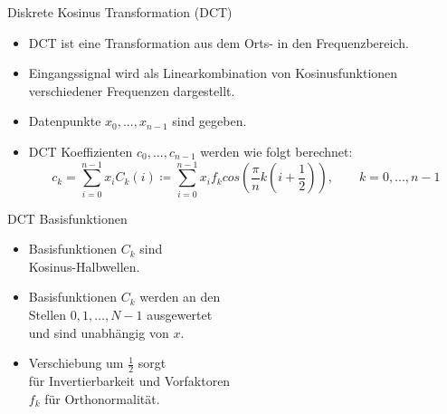 \documentclass[aspectratio=169, 12pt]{beamer}
\begin{document}
\begin{frame}{Diskrete Kosinus Transformation (DCT)}
  \begin{itemize}
    \item DCT ist eine Transformation aus dem Orts- in den Frequenzbereich.
    \item Eingangssignal wird als Linearkombination von Kosinusfunktionen verschiedener Frequenzen dargestellt.
    \item Datenpunkte $x_0, ..., x_{n-1}$ sind gegeben.
    \item DCT Koeffizienten $c_0, ..., c_{n-1}$ werden wie folgt berechnet:
          \begin{equation*}
            c_k = \sum_{i=0}^{n-1} x_i C_k(i) \coloneqq \sum_{i=0}^{n-1} x_i f_k cos\left( \frac{\pi}{n} k \left( i + \frac{1}{2} \right) \right), \qquad k = 0, ..., n-1
          \end{equation*}
  \end{itemize}
\end{frame}

\begin{frame}{DCT Basisfunktionen}
  \begin{figure}
    \vspace{-1.3cm}
  \end{figure}
  \leavevmode
  \vspace{-1.0cm}
  \begin{itemize}
    \item Basisfunktionen $C_k$ sind \\ Kosinus-Halbwellen.
    \item Basisfunktionen $C_k$ werden an den \\ Stellen $0, 1, \ldots , N-1$ ausgewertet \\ und sind unabhängig von $x$.
    \item Verschiebung um $\frac{1}{2}$ sorgt \\ für Invertierbarkeit und Vorfaktoren \\ $f_k$ für Orthonormalität.
  \end{itemize}
\end{frame}

\end{document}
